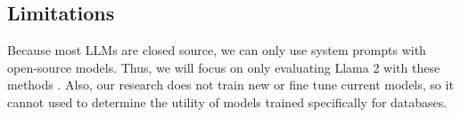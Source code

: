 \subsection{Limitations}
Because most LLMs are closed source, we can only use system prompts with open-source models. Thus, we will focus on only evaluating Llama 2 with these methods \cite{touvron2023}. Also, our research does not train new or fine tune current models, so it cannot used to determine the utility of models trained specifically for databases.


